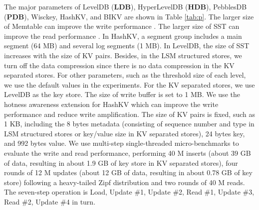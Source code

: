 \documentclass[sigconf]{acmart}
\begin{document}
The major parameters of LevelDB (\textbf{LDB}), HyperLevelDB (\textbf{HDB}), PebblesDB (\textbf{PDB}), Wisckey, HashKV, and BIKV are shown in Table \ref{tab:p}. The larger size of Memtable can improve the write performance \cite{OHDB, FloDB}. The larger size of SST can improve the read performance \cite{OHDB}. In HashKV, a segment group includes a main segment (64 MB) and several log segments (1 MB). In LevelDB, the size of SST increases with the size of KV pairs. Besides, in the LSM structured stores, we turn off the data compression since there is no data compression in the KV separated stores. For other parameters, such as the threshold size of each level, we use the default values in the experiments. For the KV separated stores, we use LevelDB as the key store. The size of write buffer is set to 1 MB. We use the hotness awareness extension for HashKV which can improve the write performance and reduce write amplification. {\color{red}{For KVell, we do several experiments under various configurations and choose an experimental result which is relatively better at update performance and space amplification but slightly worse at write/read performance, configured with one disk, two workers and one load thread. KVell implements a producer-consumer like GC strategy, when deleting a KV pair, buffer its location and reuse it immediately when new data comes.}} The size of KV pairs is fixed, such as 1 KB, including the 8 bytes metadata (consisting of sequence number and type in LSM structured stores or key/value size in KV separated stores), 24 bytes key, and 992 bytes value. We use multi-step single-threaded micro-benchmarks to evaluate the write and read performance, performing 40 M inserts (about 39 GB of data, resulting in about 1.9 GB of key store in KV separated stores), four rounds of 12 M updates (about 12 GB of data, resulting in about 0.78 GB of key store) following a heavy-tailed Zipf distribution and two rounds of 40 M reads. The seven-step operation is Load, Update \#1, Update \#2, Read \#1, Update \#3, Read \#2, Update \#4 in turn. {\color{red}{Explain why we use these seven step? what are their respective purposes?}} {}
\end{document}

